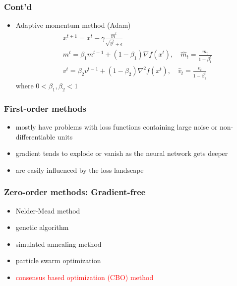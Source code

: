 \documentclass[aspectratio=169]{beamer}
\begin{document}
\begin{frame}
\frametitle{Cont'd}

\begin{itemize}
	\item Adaptive momentum method (Adam)  
	\begin{align*}
	&x^{t+1} = x^t - \gamma \frac{\hat{m}^t}{\sqrt{\hat{v}^t}+\epsilon}\\
	&m^t = \beta_1 m^{t-1} + (1-\beta_1) \nabla f(x^t), \quad \hat{m}_t = \frac{m_t}{1-\beta_1^t}\\
	&v^t = \beta_2 v^{t-1} + (1-\beta_2) \nabla^2 f(x^t), \quad \hat{v}_t = \frac{v_t}{1-\beta_1^t}
	\end{align*}
	where $0<\beta_1,\beta_2<1$
\end{itemize}
\end{frame}

\begin{frame}
\frametitle{First-order methods}

\begin{itemize}
	\item mostly have problems with loss functions containing large noise or non-differentiable units
	\item gradient tends to explode or vanish as the neural network gets deeper
	\item are easily influenced by the loss landscape
\end{itemize}

\end{frame}

\begin{frame}
	\frametitle{Zero-order methods: Gradient-free}
	
	\begin{itemize}
		\item Nelder-Mead method
		\item genetic algorithm
		\item simulated annealing method
		\item particle swarm optimization
		\item \textcolor{red}{consensus based optimization (CBO) method} 
	\end{itemize}
\end{frame}
\end{document}
